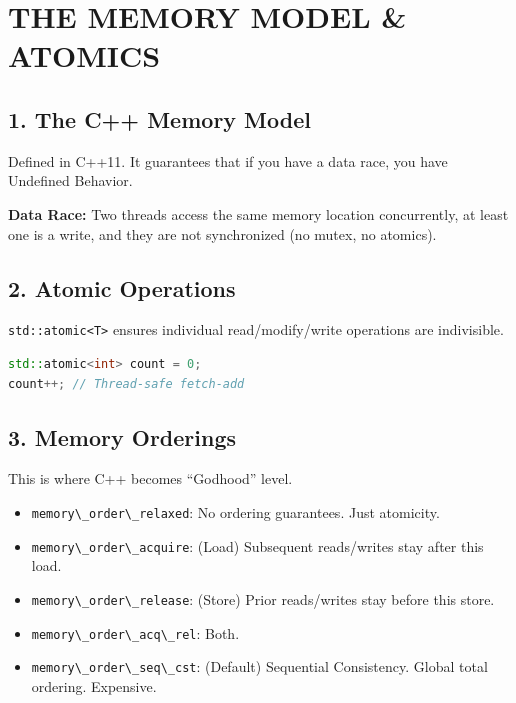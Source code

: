 \hypertarget{the-memory-model-atomics}{%
\chapter{THE MEMORY MODEL \& ATOMICS}\label{the-memory-model-atomics}}

\hypertarget{the-c-memory-model}{%
\section{1. The C++ Memory Model}\label{the-c-memory-model}}

Defined in C++11. It guarantees that if you have a data race, you have
Undefined Behavior.

\textbf{Data Race:} Two threads access the same memory location
concurrently, at least one is a write, and they are not synchronized (no
mutex, no atomics).

\hypertarget{atomic-operations}{%
\section{2. Atomic Operations}\label{atomic-operations}}

\passthrough{\lstinline!std::atomic<T>!} ensures individual
read/modify/write operations are indivisible.

\begin{lstlisting}[language={C++}]
std::atomic<int> count = 0;
count++; // Thread-safe fetch-add
\end{lstlisting}

\hypertarget{memory-orderings}{%
\section{3. Memory Orderings}\label{memory-orderings}}

This is where C++ becomes ``Godhood'' level.

\begin{itemize}
\tightlist
\item
  \passthrough{\lstinline!memory\_order\_relaxed!}: No ordering
  guarantees. Just atomicity.
\item
  \passthrough{\lstinline!memory\_order\_acquire!}: (Load) Subsequent
  reads/writes stay after this load.
\item
  \passthrough{\lstinline!memory\_order\_release!}: (Store) Prior
  reads/writes stay before this store.
\item
  \passthrough{\lstinline!memory\_order\_acq\_rel!}: Both.
\item
  \passthrough{\lstinline!memory\_order\_seq\_cst!}: (Default)
  Sequential Consistency. Global total ordering. Expensive.
\end{itemize}

